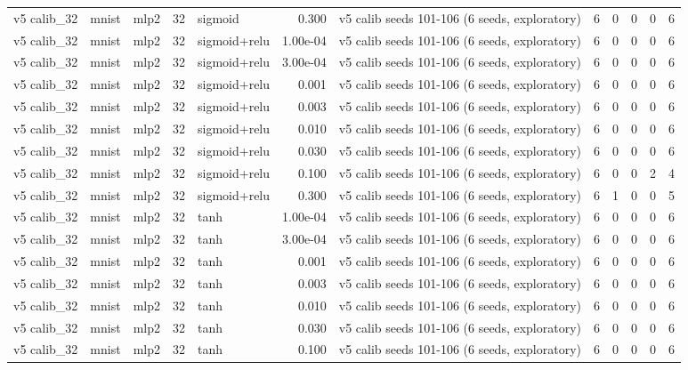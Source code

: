 \begin{table}[htbp]
{\begin{tabular}{@{}lllrlrlrrrrr@{}}
v5 calib\_32 & mnist & mlp2 & 32 & sigmoid & 0.300 & v5 calib seeds 101-106 (6 seeds, exploratory) & 6 & 0 & 0 & 0 & 6 \\
v5 calib\_32 & mnist & mlp2 & 32 & sigmoid+relu & 1.00e-04 & v5 calib seeds 101-106 (6 seeds, exploratory) & 6 & 0 & 0 & 0 & 6 \\
v5 calib\_32 & mnist & mlp2 & 32 & sigmoid+relu & 3.00e-04 & v5 calib seeds 101-106 (6 seeds, exploratory) & 6 & 0 & 0 & 0 & 6 \\
v5 calib\_32 & mnist & mlp2 & 32 & sigmoid+relu & 0.001 & v5 calib seeds 101-106 (6 seeds, exploratory) & 6 & 0 & 0 & 0 & 6 \\
v5 calib\_32 & mnist & mlp2 & 32 & sigmoid+relu & 0.003 & v5 calib seeds 101-106 (6 seeds, exploratory) & 6 & 0 & 0 & 0 & 6 \\
v5 calib\_32 & mnist & mlp2 & 32 & sigmoid+relu & 0.010 & v5 calib seeds 101-106 (6 seeds, exploratory) & 6 & 0 & 0 & 0 & 6 \\
v5 calib\_32 & mnist & mlp2 & 32 & sigmoid+relu & 0.030 & v5 calib seeds 101-106 (6 seeds, exploratory) & 6 & 0 & 0 & 0 & 6 \\
v5 calib\_32 & mnist & mlp2 & 32 & sigmoid+relu & 0.100 & v5 calib seeds 101-106 (6 seeds, exploratory) & 6 & 0 & 0 & 2 & 4 \\
v5 calib\_32 & mnist & mlp2 & 32 & sigmoid+relu & 0.300 & v5 calib seeds 101-106 (6 seeds, exploratory) & 6 & 1 & 0 & 0 & 5 \\
v5 calib\_32 & mnist & mlp2 & 32 & tanh & 1.00e-04 & v5 calib seeds 101-106 (6 seeds, exploratory) & 6 & 0 & 0 & 0 & 6 \\
v5 calib\_32 & mnist & mlp2 & 32 & tanh & 3.00e-04 & v5 calib seeds 101-106 (6 seeds, exploratory) & 6 & 0 & 0 & 0 & 6 \\
v5 calib\_32 & mnist & mlp2 & 32 & tanh & 0.001 & v5 calib seeds 101-106 (6 seeds, exploratory) & 6 & 0 & 0 & 0 & 6 \\
v5 calib\_32 & mnist & mlp2 & 32 & tanh & 0.003 & v5 calib seeds 101-106 (6 seeds, exploratory) & 6 & 0 & 0 & 0 & 6 \\
v5 calib\_32 & mnist & mlp2 & 32 & tanh & 0.010 & v5 calib seeds 101-106 (6 seeds, exploratory) & 6 & 0 & 0 & 0 & 6 \\
v5 calib\_32 & mnist & mlp2 & 32 & tanh & 0.030 & v5 calib seeds 101-106 (6 seeds, exploratory) & 6 & 0 & 0 & 0 & 6 \\
v5 calib\_32 & mnist & mlp2 & 32 & tanh & 0.100 & v5 calib seeds 101-106 (6 seeds, exploratory) & 6 & 0 & 0 & 0 & 6 \\

\end{tabular}}
\end{table}

